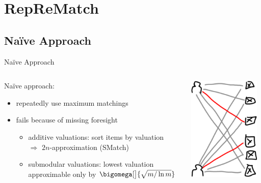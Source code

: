 \section{RepReMatch}

\subsection{Naïve Approach}
\begin{frame}{Naïve Approach}
	\begin{columns}[t, onlytextwidth]
		\begin{column}{0.6\textwidth}
			Naïve approach:
			\begin{itemize}
				\item
				repeatedly use maximum matchings

				\item
				fails because of missing foresight
				\begin{itemize}
					\item
					additive valuations:
					sort items by valuation \\
					\(\Rightarrow\) \(2n\)-approximation (SMatch)

					\item
					submodular valuations:
					lowest valuation \\
					approximable only by \(\bigomega[\big]{ \sqrt{m/\ln m} }\) \smash{\raisebox{-.25ex}{\Large\Lightning}}
				\end{itemize}
			\end{itemize}
		\end{column}
		\begin{column}{0.4\textwidth}
			\vphantom{a}\vspace{-0.5\baselineskip}\par
			\centering
			\includegraphics[height=5cm]{img/repeatedmatching}
		\end{column}
	\end{columns}
\end{frame}





